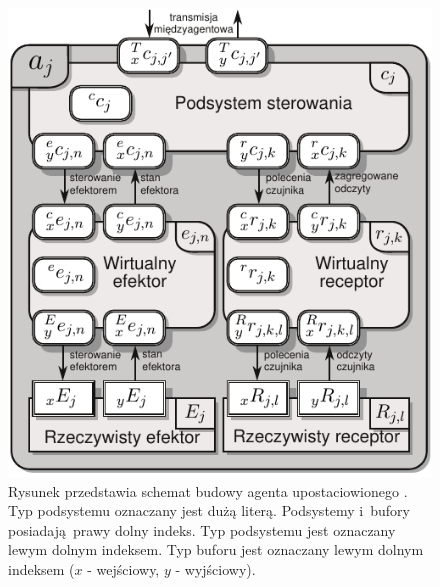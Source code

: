 \begin{figure}
	\centering
	\includegraphics[width=.6\textwidth]{images/agent_structure.pdf}
	\caption{Rysunek przedstawia schemat budowy agenta upostaciowionego \cite{Zielinski:2014_kkr_relacje-twiki}. Typ podsystemu oznaczany jest dużą literą. Podsystemy i~bufory posiadają prawy dolny indeks. Typ podsystemu jest oznaczany lewym dolnym indeksem.  Typ buforu jest oznaczany lewym dolnym indeksem ($x$ - wejściowy, $y$ - wyjściowy).}
	\label{fig:upostaciowiony}
\end{figure}